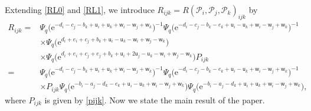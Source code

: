 \documentclass[pdftex]{sigma}
\newcommand{\e}{{\mathrm e}}
\newcommand{\uu}{{\mathsf u}}
\newcommand{\ww}{{\mathsf w}}
\numberwithin{equation}{section}
\begin{document}
Extending \eqref{RL0} and \eqref{RL1}, we introduce
$R_{ijk}=R(\mathscr{P}_i ,\mathscr{P}_j ,\mathscr{P}_k)_{ijk}$
by
\begin{align}
R_{ijk}
={}&
\Psi_q\bigl(\e^{-d_i-c_j-b_k+\uu_i+\uu_k+\ww_i-\ww_j+\ww_k}\bigr)^{-1}
\Psi_q\bigl(\e^{-d_i-c_j-b_k-e_k+\uu_i-\uu_k+\ww_i-\ww_j+\ww_k}\bigr)^{-1}
\nonumber \\
& \times
\Psi_q\bigl(\e^{d_i+e_i+c_j+b_k+\uu_i-\uu_k-\ww_i+\ww_j-\ww_k}\bigr)\nonumber \\
& \times
\Psi_q\bigl(\e^{d_i+e_i+c_j+e_j+b_k+\uu_i+2\uu_j-\uu_k-\ww_i+\ww_j-\ww_k}\bigr)P_{ijk}
\label{rijk0}\\
={}&
\Psi_q\bigl(\e^{-d_i-c_j-b_k+\uu_i+\uu_k+\ww_i-\ww_j+\ww_k}\bigr)^{-1}
\Psi_q\bigl(\e^{-d_i-c_j-b_k-e_k+\uu_i-\uu_k+\ww_i-\ww_j+\ww_k}\bigr)^{-1}
\nonumber\\
& \times P_{ijk}
\Psi_q\bigl(\e^{-b_i-a_j-d_k-e_k+\uu_i-\uu_k+\ww_i-\ww_j+\ww_k}\bigr)
\Psi_q\bigl(\e^{-b_i-a_j-d_k+\uu_i+\uu_k+\ww_i-\ww_j+\ww_k}\bigr),
\label{rijk}
\end{align}
where $P_{ijk}$ is given by \eqref{pijk}.
Now we state the main result of the paper.
\end{document}
